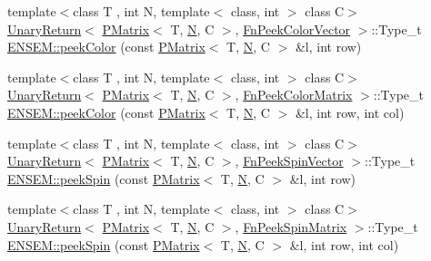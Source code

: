 \begin{DoxyCompactItemize}
\item 
{\footnotesize template$<$class T , int N, template$<$ class, int $>$ class C$>$ }\\\mbox{\hyperlink{structENSEM_1_1UnaryReturn}{Unary\+Return}}$<$ \mbox{\hyperlink{classENSEM_1_1PMatrix}{P\+Matrix}}$<$ T, \mbox{\hyperlink{operator__name__util_8cc_a7722c8ecbb62d99aee7ce68b1752f337}{N}}, C $>$, \mbox{\hyperlink{structENSEM_1_1FnPeekColorVector}{Fn\+Peek\+Color\+Vector}} $>$\+::Type\+\_\+t \mbox{\hyperlink{group__primmatrix_ga95fe2504ecc461173cb780afe6dbbbf4}{E\+N\+S\+E\+M\+::peek\+Color}} (const \mbox{\hyperlink{classENSEM_1_1PMatrix}{P\+Matrix}}$<$ T, \mbox{\hyperlink{operator__name__util_8cc_a7722c8ecbb62d99aee7ce68b1752f337}{N}}, C $>$ \&l, int row)
\item 
{\footnotesize template$<$class T , int N, template$<$ class, int $>$ class C$>$ }\\\mbox{\hyperlink{structENSEM_1_1UnaryReturn}{Unary\+Return}}$<$ \mbox{\hyperlink{classENSEM_1_1PMatrix}{P\+Matrix}}$<$ T, \mbox{\hyperlink{operator__name__util_8cc_a7722c8ecbb62d99aee7ce68b1752f337}{N}}, C $>$, \mbox{\hyperlink{structENSEM_1_1FnPeekColorMatrix}{Fn\+Peek\+Color\+Matrix}} $>$\+::Type\+\_\+t \mbox{\hyperlink{group__primmatrix_gaa9e8d0698d08d9e4b6924a14192c17b4}{E\+N\+S\+E\+M\+::peek\+Color}} (const \mbox{\hyperlink{classENSEM_1_1PMatrix}{P\+Matrix}}$<$ T, \mbox{\hyperlink{operator__name__util_8cc_a7722c8ecbb62d99aee7ce68b1752f337}{N}}, C $>$ \&l, int row, int col)
\item 
{\footnotesize template$<$class T , int N, template$<$ class, int $>$ class C$>$ }\\\mbox{\hyperlink{structENSEM_1_1UnaryReturn}{Unary\+Return}}$<$ \mbox{\hyperlink{classENSEM_1_1PMatrix}{P\+Matrix}}$<$ T, \mbox{\hyperlink{operator__name__util_8cc_a7722c8ecbb62d99aee7ce68b1752f337}{N}}, C $>$, \mbox{\hyperlink{structENSEM_1_1FnPeekSpinVector}{Fn\+Peek\+Spin\+Vector}} $>$\+::Type\+\_\+t \mbox{\hyperlink{group__primmatrix_gaf26619f85146d483d1c177abf5c2f476}{E\+N\+S\+E\+M\+::peek\+Spin}} (const \mbox{\hyperlink{classENSEM_1_1PMatrix}{P\+Matrix}}$<$ T, \mbox{\hyperlink{operator__name__util_8cc_a7722c8ecbb62d99aee7ce68b1752f337}{N}}, C $>$ \&l, int row)
\item 
{\footnotesize template$<$class T , int N, template$<$ class, int $>$ class C$>$ }\\\mbox{\hyperlink{structENSEM_1_1UnaryReturn}{Unary\+Return}}$<$ \mbox{\hyperlink{classENSEM_1_1PMatrix}{P\+Matrix}}$<$ T, \mbox{\hyperlink{operator__name__util_8cc_a7722c8ecbb62d99aee7ce68b1752f337}{N}}, C $>$, \mbox{\hyperlink{structENSEM_1_1FnPeekSpinMatrix}{Fn\+Peek\+Spin\+Matrix}} $>$\+::Type\+\_\+t \mbox{\hyperlink{group__primmatrix_ga2efe19b2ef4dc4cbacc12117645bf8b8}{E\+N\+S\+E\+M\+::peek\+Spin}} (const \mbox{\hyperlink{classENSEM_1_1PMatrix}{P\+Matrix}}$<$ T, \mbox{\hyperlink{operator__name__util_8cc_a7722c8ecbb62d99aee7ce68b1752f337}{N}}, C $>$ \&l, int row, int col)

\end{DoxyCompactItemize}
